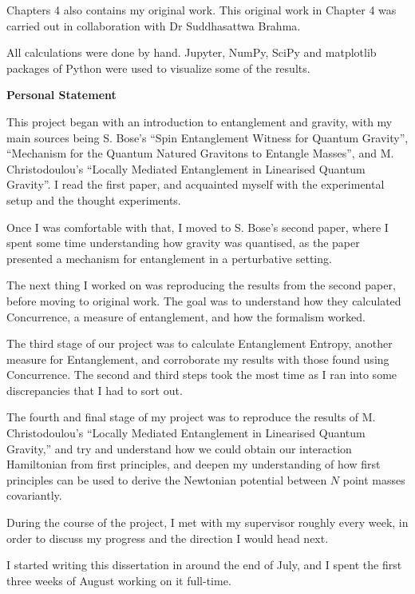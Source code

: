 \documentclass[12pt,a4paper]{report}
\theoremstyle{plain}
\theoremstyle{definition}
\theoremstyle{remark}
\begin{document}
Chapters 4 also contains my original work. This original work in
Chapter 4 was carried out in collaboration with Dr Suddhasattwa Brahma.

All calculations were done by hand. Jupyter, NumPy, SciPy and matplotlib packages of Python were used to visualize some of the results.

\newpage

\begin{center}
\textbf{Personal Statement}
\end{center}

This project began with an introduction to entanglement and gravity, with my main sources being S. Bose's ``Spin Entanglement Witness for Quantum Gravity'', ``Mechanism for the Quantum Natured Gravitons to Entangle Masses'', and M. Christodoulou's ``Locally Mediated Entanglement in Linearised Quantum Gravity''. I read the first paper, and acquainted myself with the experimental setup and the thought experiments.

Once I was comfortable with that, I moved to S. Bose's second paper, where I spent some time understanding how gravity was quantised, as the paper presented a mechanism for entanglement in a perturbative setting.

The next thing I worked on was reproducing the results from the second paper, before moving to original work. The goal was to understand how they calculated Concurrence, a measure of entanglement, and how the formalism worked.

The third stage of our project was to calculate Entanglement Entropy, another measure for Entanglement, and corroborate my results with those found using Concurrence. The second and third steps took the most time as I ran into some discrepancies that I had to sort out.

The fourth and final stage of my project was to reproduce the results of M. Christodoulou's ``Locally Mediated Entanglement in Linearised Quantum Gravity,'' and try and understand how we could obtain our interaction Hamiltonian from first principles, and deepen my understanding of how first principles can be used to derive the Newtonian potential between $N$ point masses covariantly.

During the course of the project, I met with my supervisor roughly every week,
in order to discuss my progress and the direction I would head
next.

I started writing this dissertation in around the end of July, and I spent the first
three weeks of August working on it full-time.
\end{document}
